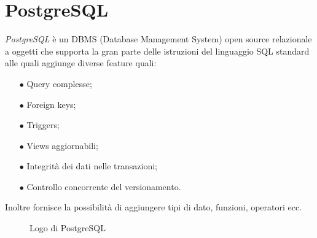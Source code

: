 \section{PostgreSQL}\label{sec:postgresql}
\emph{PostgreSQL} è un DBMS (Database Management System) open source relazionale a oggetti che supporta la gran parte delle istruzioni del linguaggio SQL standard alle quali aggiunge diverse feature quali:
\begin{itemize}
	\item[$\bullet$]Query complesse;
	\item[$\bullet$]Foreign keys;
	\item[$\bullet$]Triggers;
	\item[$\bullet$]Views aggiornabili;
	\item[$\bullet$]Integrità dei dati nelle transazioni;
	\item[$\bullet$]Controllo concorrente del versionamento.
\end{itemize}
Inoltre fornisce la possibilità di aggiungere tipi di dato, funzioni, operatori ecc. \cite{PostgreSQL}
\begin{figure}[ht]
	\centering
	\caption{Logo di PostgreSQL}
	\label{fig:one}
\end{figure}

